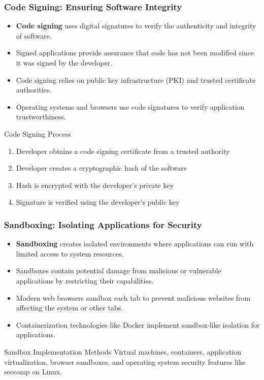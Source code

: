 \documentclass{beamer}
\begin{document}
\begin{frame}
    \frametitle{Code Signing: Ensuring Software Integrity}
    
    \begin{itemize}
        \item \textbf{Code signing} uses digital signatures to verify the authenticity and integrity of software.
        \item Signed applications provide assurance that code has not been modified since it was signed by the developer.
        \item Code signing relies on public key infrastructure (PKI) and trusted certificate authorities.
        \item Operating systems and browsers use code signatures to verify application trustworthiness.
    \end{itemize}
    
    \begin{alertblock}{Code Signing Process}
        \begin{enumerate}
            \item Developer obtains a code signing certificate from a trusted authority
            \item Developer creates a cryptographic hash of the software
            \item Hash is encrypted with the developer's private key
            \item Signature is verified using the developer's public key
        \end{enumerate}
    \end{alertblock}
\end{frame}

\begin{frame}
    \frametitle{Sandboxing: Isolating Applications for Security}
    
    \begin{itemize}
        \item \textbf{Sandboxing} creates isolated environments where applications can run with limited access to system resources.
        \item Sandboxes contain potential damage from malicious or vulnerable applications by restricting their capabilities.
        \item Modern web browsers sandbox each tab to prevent malicious websites from affecting the system or other tabs.
        \item Containerization technologies like Docker implement sandbox-like isolation for applications.
    \end{itemize}
    
    \begin{exampleblock}{Sandbox Implementation Methods}
        Virtual machines, containers, application virtualization, browser sandboxes, and operating system security features like seccomp on Linux.
    \end{exampleblock}
\end{frame}
\end{document}
